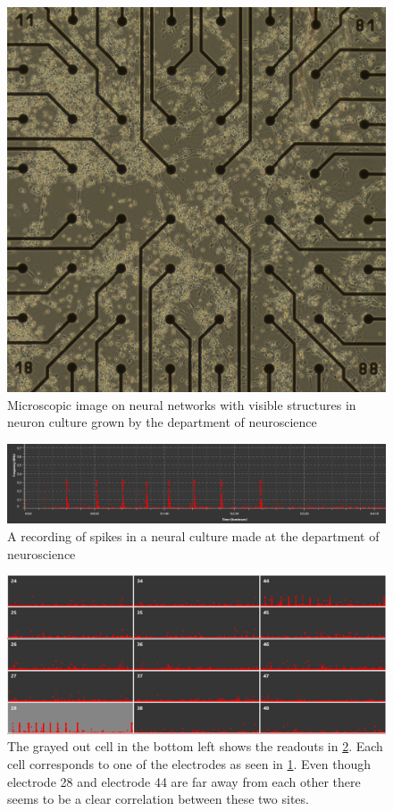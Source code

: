 \begin{figure}[h!]
    \includegraphics[width=\linewidth]{images/cells.png}
    \caption{Microscopic image on neural networks with visible structures in
      neuron culture grown by the department of neuroscience}
    \label{fig:cellular_networks}
\end{figure}
\begin{figure}[h!]
    \includegraphics[width=\linewidth]{images/crop_corr28.png}
    \caption{A recording of spikes in a neural culture made at the department of neuroscience}
    \label{fig:pacemaker}
\end{figure}
\begin{figure}[h!]
    \includegraphics[width=\linewidth]{images/tonic1.png}
    \caption{The grayed out cell in the bottom left shows the readouts in
      \ref{fig:pacemaker}.
      Each cell corresponds to one of the electrodes as seen in
      \ref{fig:cellular_networks}. Even though electrode 28 and electrode 44 are
      far away from each other there seems to be a clear correlation between these two
    sites.}
    \label{fig:correlation}
\end{figure}
